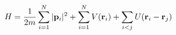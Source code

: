 \documentclass[preview]{standalone}
\begin{document}
\begin{align*}
\special{dvisvgm:raw <g id='unique000'>}H= \special{dvisvgm:raw </g>}\special{dvisvgm:raw <g id='unique001'>}\frac{1}{2m}\sum_{i=1}^{N}|\va p_i|^{2} \special{dvisvgm:raw </g>}\special{dvisvgm:raw <g id='unique002'>}+\sum_{i=1}^{N}V(\va r_i) \special{dvisvgm:raw </g>}\special{dvisvgm:raw <g id='unique003'>}+\sum_{i<j}U(\va r_i-\va r_j)\special{dvisvgm:raw </g>}
\end{align*}
\end{document}
